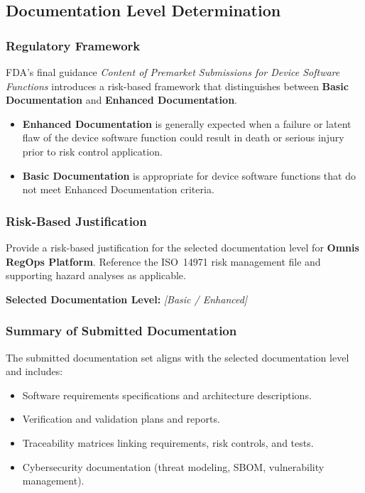 \documentclass[11pt]{article}
\begin{document}
\subsection{Documentation Level Determination}

\subsubsection{Regulatory Framework}
FDA's final guidance \textit{Content of Premarket Submissions for Device
Software Functions} introduces a risk-based framework that distinguishes between
\textbf{Basic Documentation} and \textbf{Enhanced Documentation}.

\begin{itemize}
    \item \textbf{Enhanced Documentation} is generally expected when a failure
          or latent flaw of the device software function could result in death
          or serious injury prior to risk control application.
    \item \textbf{Basic Documentation} is appropriate for device software
          functions that do not meet Enhanced Documentation criteria.
\end{itemize}

\subsubsection{Risk-Based Justification}
Provide a risk-based justification for the selected documentation level for
\textbf{Omnis RegOps Platform}. Reference the ISO~14971 risk management file and
supporting hazard analyses as applicable.

\medskip
\noindent
\textbf{Selected Documentation Level:} \textit{[Basic / Enhanced]}

\subsubsection{Summary of Submitted Documentation}
The submitted documentation set aligns with the selected documentation level
and includes:
\begin{itemize}
    \item Software requirements specifications and architecture descriptions.
    \item Verification and validation plans and reports.
    \item Traceability matrices linking requirements, risk controls, and tests.
    \item Cybersecurity documentation (threat modeling, SBOM, vulnerability
          management).
\end{itemize}
\end{document}
